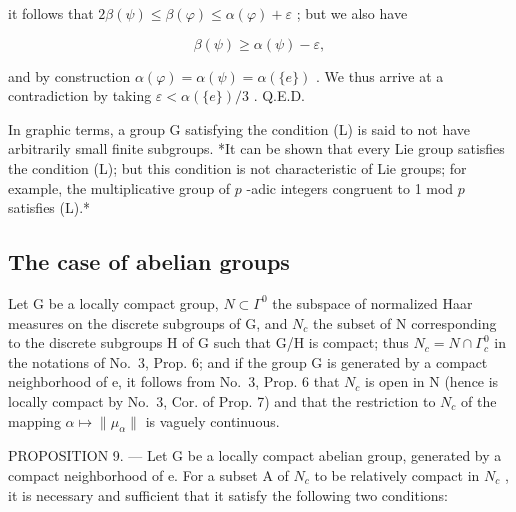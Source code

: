 it follows that \(2\beta (\psi)\leqslant \beta (\varphi)\leqslant \alpha (\varphi) + \varepsilon\) ; but we also have

\[
\beta (\psi) \geqslant \alpha (\psi) - \varepsilon ,
\]

and by construction \(\alpha(\varphi) = \alpha(\psi) = \alpha(\{e\})\) . We thus arrive at a contradiction by taking \(\varepsilon < \alpha(\{e\})/3\) . Q.E.D.

In graphic terms, a group G satisfying the condition (L) is said to not have arbitrarily small finite subgroups. *It can be shown that every Lie group satisfies the condition (L); but this condition is not characteristic of Lie groups; for example, the multiplicative group of \(p\) -adic integers congruent to 1 mod \(p\) satisfies (L).*

\subsection{The case of abelian groups}

Let G be a locally compact group, \(N \subset \Gamma^{0}\) the subspace of normalized Haar measures on the discrete subgroups of G, and \(N_{c}\) the subset of N corresponding to the discrete subgroups H of G such that G/H is compact; thus \(N_{c} = N \cap \Gamma_{c}^{0}\) in the notations of No.~3, Prop. 6; and if the group G is generated by a compact neighborhood of e, it follows from No.~3, Prop. 6 that \(N_{c}\) is open in N (hence is locally compact by No.~3, Cor. of Prop. 7) and that the restriction to \(N_{c}\) of the mapping \(\alpha \mapsto \|\mu_{\alpha}\|\) is vaguely continuous.

PROPOSITION 9. --- Let G be a locally compact abelian group, generated by a compact neighborhood of e. For a subset A of \(N_{c}\) to be relatively compact in \(N_{c}\) , it is necessary and sufficient that it satisfy the following two conditions:

